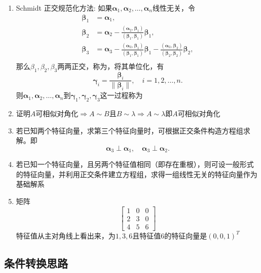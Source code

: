 \documentclass[./linear_algebra.tex]{subfiles}
\begin{document}
    \begin{enumerate}
        \item Schmidt 正交规范化方法: 如果$\bm{\alpha}_1, \bm{\alpha}_2, \dots, \bm{\alpha}_n$线性无关，令
        \[
            \begin{aligned}
                \bm{\beta}_1 &= \bm{\alpha}_1, \\[6pt]
                \bm{\beta}_2 &= \bm{\alpha}_2 - \frac{(\bm{\alpha}_2, \bm{\beta}_1)}{(\bm{\beta}_1, \bm{\beta}_1)} \bm{\beta}_1, \\[6pt]
                \bm{\beta}_3 &= \bm{\alpha}_3 - \frac{(\bm{\alpha}_3, \bm{\beta}_1)}{(\bm{\beta}_1, \bm{\beta}_1)} \bm{\beta}_1
                - \frac{(\bm{\alpha}_3, \bm{\beta}_2)}{(\bm{\beta}_2, \bm{\beta}_2)} \bm{\beta}_2, \\[6pt]
            \end{aligned}
        \]
        那么$\beta_1, \beta_2, \beta_3$两两正交，称为{\color[rgb]{0.2, 0.6, 0.3}{正交向量组}}，将其单位化，有
        \[
            \bm{\gamma}_i = \frac{\bm{\beta}_i}{\|\bm{\beta}_i\|}, \quad i = 1, 2, \dots, n.
        \]
        则$\bm{\alpha}_1, \bm{\alpha}_2, \dots, \bm{\alpha}_n$到$\bm{\gamma}_1, \bm{\gamma}_2, \bm{\gamma}_3$这一过程称为{\color[rgb]{0.2, 0.6, 0.3}{Schmidt正交规范化}}
        \item 证明$A$可相似对角化$\Rightarrow A \sim B \text{且} B \sim \lambda \Rightarrow A \sim \lambda$即$A$可相似对角化
        \item 若已知两个特征向量，求第三个特征向量时，可根据正交条件构造方程组求解。即
        \[
            \bm{\alpha}_3 \perp \bm{\alpha}_1, \quad
            \bm{\alpha}_3 \perp \bm{\alpha}_2.
        \]
        \item 若已知一个特征向量，且另两个特征值相同（即存在重根），则可设一般形式的特征向量，并利用正交条件建立方程组，求得一组线性无关的特征向量作为基础解系
        \item 矩阵
        \[
            \begin{bmatrix}
                1 & 0 & 0 \\
                2 & 3 & 0 \\
                4 & 5 & 6
            \end{bmatrix}
        \]特征值从主对角线上看出来，为$1, 3, 6$且特征值6的特征向量是$(0, 0, 1)^T$
    \end{enumerate}

    \subsection{条件转换思路}
\end{document}
